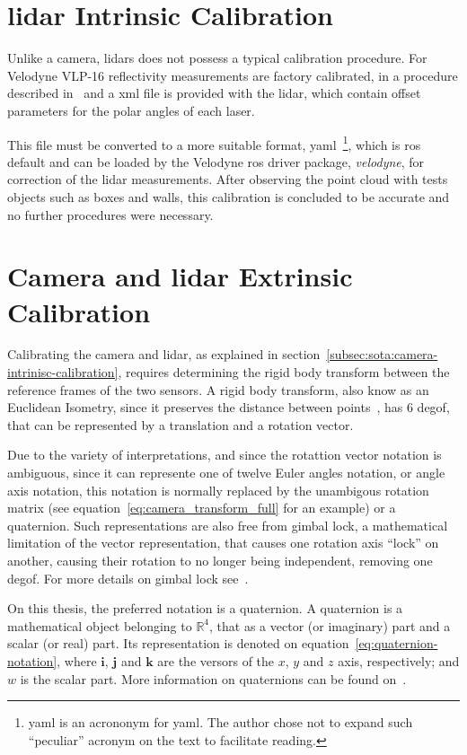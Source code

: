 	

\section{\ac{lidar} Intrinsic Calibration}
Unlike a camera, \acp{lidar} does not possess a typical calibration procedure. For Velodyne VLP-16 reflectivity measurements are factory calibrated, in a procedure described in~\cite{vlp16} and a \ac{xml} file is provided with the \ac{lidar}, which contain offset parameters for the polar angles of each laser.

This file must be converted to a more suitable format, \acs{yaml}~\footnote{\acs{yaml} is an acrononym for \acl{yaml}. The author chose not to expand such  ``peculiar'' acronym on the text to facilitate reading.}, which is \ac{ros} default and can be loaded by the Velodyne \ac{ros} driver package, \emph{velodyne}, for correction of the \ac{lidar} measurements. After observing the point cloud with tests objects such as boxes and walls, this calibration is concluded to be accurate and no further procedures were necessary.

\section{Camera and \ac{lidar} Extrinsic Calibration}
Calibrating the camera and \ac{lidar}, as explained in section~\ref{subsec:sota:camera-intrinisc-calibration}, requires determining the rigid body transform between the reference frames of the two sensors. A rigid body transform, also know as an Euclidean Isometry, since it preserves the distance between points~\cite{mvg_book}, has 6 \ac{degof}, that can be represented by a translation and a rotation vector.

Due to the variety of interpretations, and since the rotattion vector notation is ambiguous, since it can represente one of twelve Euler angles notation, or angle axis notation, this notation is normally replaced by the unambigous rotation matrix (see equation~\ref{eq:camera_transform_full} for an example) or a quaternion. Such representations are also free from gimbal lock, a mathematical limitation of the vector representation, that causes one rotation axis ``lock'' on another, causing their rotation to no longer being independent, removing one \ac{degof}. For more details on gimbal lock see~\cite{mvg_book, Slabaugh, camera_models}.

On this thesis, the preferred notation is a quaternion. A quaternion is a mathematical object belonging to $\mathbb{R}^4$, that as a vector (or imaginary) part and a scalar (or real) part. Its representation is denoted on equation~\ref{eq:quaternion-notation}, where $\mathbf{i}$, $\mathbf{j}$ and $\mathbf{k}$ are the versors of the $x$, $y$ and $z$ axis, respectively; and $w$ is the scalar part. More information on quaternions can be found on~\cite{mvg_book}.

